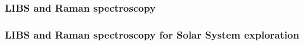 \documentclass[10pt]{beamer}
\begin{document}
\begin{frame}
   \frametitle{LIBS and Raman spectroscopy}
\end{frame}

\begin{frame}
   \frametitle{LIBS and Raman spectroscopy for Solar System exploration}
\end{frame}

   
\end{document}
